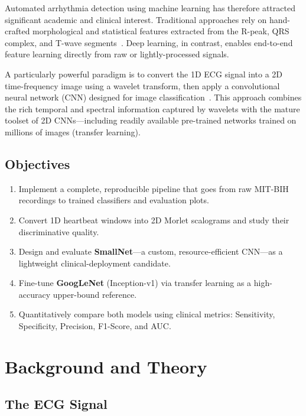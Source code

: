 \documentclass[12pt,a4paper]{article}
\begin{document}
Automated arrhythmia detection using machine learning has therefore attracted
significant academic and clinical interest.  Traditional approaches rely on
hand-crafted morphological and statistical features extracted from the R-peak,
QRS complex, and T-wave segments~\cite{de2004automatic}.  Deep learning, in
contrast, enables end-to-end feature learning directly from raw or
lightly-processed signals.

A particularly powerful paradigm is to convert the 1D ECG signal into a 2D
time-frequency image using a wavelet transform, then apply a convolutional
neural network (CNN) designed for image classification~\cite{wang2019ecg}.
This approach combines the rich temporal and spectral information captured by
wavelets with the mature toolset of 2D CNNs---including readily available
pre-trained networks trained on millions of images (transfer learning).

\subsection{Objectives}

\begin{enumerate}[leftmargin=*]
    \item Implement a complete, reproducible pipeline that goes from raw
          MIT-BIH recordings to trained classifiers and evaluation plots.
    \item Convert 1D heartbeat windows into 2D Morlet scalograms and study
          their discriminative quality.
    \item Design and evaluate \textbf{SmallNet}---a custom, resource-efficient
          CNN---as a lightweight clinical-deployment candidate.
    \item Fine-tune \textbf{GoogLeNet} (Inception-v1) via transfer learning as
          a high-accuracy upper-bound reference.
    \item Quantitatively compare both models using clinical metrics:
          Sensitivity, Specificity, Precision, F1-Score, and AUC.
\end{enumerate}

\section{Background and Theory}

\subsection{The ECG Signal}
\end{document}
